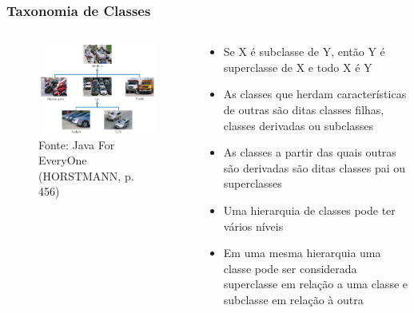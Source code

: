 \documentclass[aspectratio=169]{beamer}
\begin{document}
\begin{frame}\frametitle{Taxonomia de Classes}
\begin{columns}
\begin{column}{0.45\linewidth}
\begin{figure}[h]
	\includegraphics[height=0.55\paperheight]{pucrs-ec-poo-unidade_13-heranca-laminas-heranca.png}\\
	\tiny{Fonte: Java For EveryOne (HORSTMANN, p. 456)}
\end{figure}
\end{column}
\begin{column}{0.55\linewidth}
\begin{itemize}
	\item Se X é subclasse de Y, então Y é superclasse de X e todo X é Y
	\item As classes que herdam características de outras são ditas classes filhas, classes derivadas ou subclasses
	\item As classes a partir das quais outras são derivadas são ditas classes pai ou superclasses
	\item Uma hierarquia de classes pode ter vários níveis
	\item Em uma mesma hierarquia uma classe pode ser considerada superclasse em relação a uma classe e subclasse em relação à outra
\end{itemize}
\end{column}
\end{columns}
\end{frame}
\end{document}
